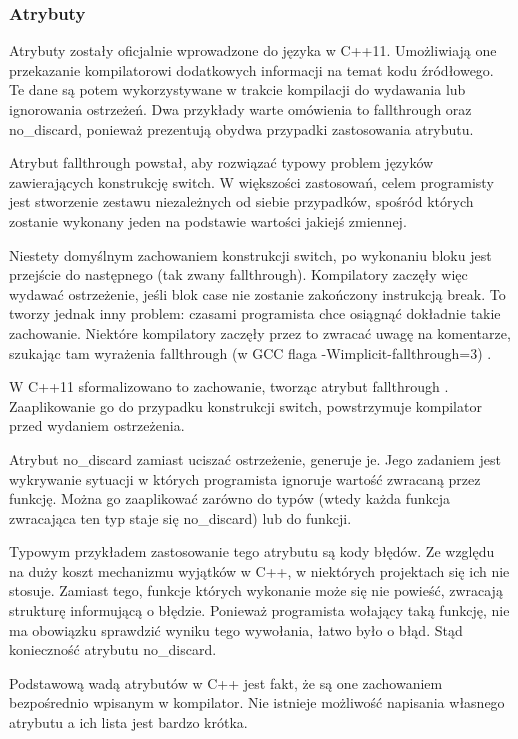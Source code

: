 \subsubsection{Atrybuty}
Atrybuty zostały oficjalnie wprowadzone do języka w C++11. Umożliwiają one przekazanie kompilatorowi dodatkowych informacji na temat kodu źródłowego. Te dane są potem wykorzystywane w trakcie kompilacji do wydawania lub ignorowania ostrzeżeń. Dwa przykłady warte omówienia to fallthrough oraz no\_discard, ponieważ prezentują obydwa przypadki zastosowania atrybutu.\par
Atrybut fallthrough powstał, aby rozwiązać typowy problem języków zawierających konstrukcję switch. W większości zastosowań, celem programisty jest stworzenie zestawu niezależnych od siebie przypadków, spośród których zostanie wykonany jeden na podstawie wartości jakiejś zmiennej.\par
Niestety domyślnym zachowaniem konstrukcji switch, po wykonaniu bloku jest przejście do następnego (tak zwany fallthrough). Kompilatory zaczęły więc wydawać ostrzeżenie, jeśli blok case nie zostanie zakończony instrukcją break. To tworzy jednak inny problem: czasami programista chce osiągnąć dokładnie takie zachowanie. Niektóre kompilatory zaczęły przez to zwracać uwagę na komentarze, szukając tam wyrażenia fallthrough (w GCC flaga -Wimplicit-fallthrough=3) \cite{gcc_warnings}.\par
W C++11 sformalizowano to zachowanie, tworząc atrybut fallthrough \cite{ISO:2012:III}. Zaaplikowanie go do przypadku konstrukcji switch, powstrzymuje kompilator przed wydaniem ostrzeżenia.\par
Atrybut no\_discard zamiast uciszać ostrzeżenie, generuje je. Jego zadaniem jest wykrywanie sytuacji w których programista ignoruje wartość zwracaną przez funkcję. Można go zaaplikować zarówno do typów (wtedy każda funkcja zwracająca ten typ staje się no\_discard) lub do funkcji.\par
Typowym przykładem zastosowanie tego atrybutu są kody błędów. Ze względu na duży koszt mechanizmu wyjątków w C++, w niektórych projektach się ich nie stosuje. Zamiast tego, funkcje których wykonanie może się nie powieść, zwracają strukturę informującą o błędzie. Ponieważ programista wołający taką funkcję, nie ma obowiązku sprawdzić wyniku tego wywołania, łatwo było o błąd. Stąd konieczność atrybutu no\_discard.\par
Podstawową wadą atrybutów w C++ jest fakt, że są one zachowaniem bezpośrednio wpisanym w kompilator. Nie istnieje możliwość napisania własnego atrybutu a ich lista jest bardzo krótka.\par
